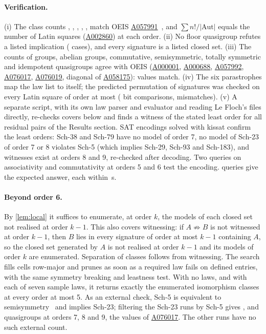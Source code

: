 \documentclass[11pt,a4paper]{article}
\newcommand{\Sch}[1]{\textsf{Sch-#1}}
\newcommand{\oeis}[1]{\href{https://oeis.org/#1}{#1}}
\theoremstyle{definition}
\begin{document}
\paragraph{Verification.}
(i) The class counts \IsoOne, \IsoTwo, \IsoThree, \IsoFour, \IsoFive, \IsoSix{} match
OEIS \oeis{A057991}~\cite{oeis}, and $\sum n!/|\mathrm{Aut}|$ equals the number of
Latin squares (\oeis{A002860}) at each order. (ii) No floor quasigroup refutes a
listed implication (\FalseRefSix{} cases), and every signature is a listed closed
set. (iii) The counts of groups, abelian groups, commutative, semisymmetric, totally
symmetric and idempotent quasigroups agree with OEIS (\oeis{A000001},
\oeis{A000688}, \oeis{A057992}, \oeis{A076017}, \oeis{A076019}, diagonal of
\oeis{A058175}):
\GThreeAllMatch{} \GThreeCells{} values match. (iv) The six parastrophes map the law
list to itself; the predicted permutation of signatures was checked on every Latin
square of order at most \GFourMaxOrder{} (\GFourChecks{} bit comparisons,
\GFourMismatches{} mismatches). (v) A separate script, with its own law parser and
evaluator and reading Le Floch's files directly, re-checks \IndepCoversOk{} covers
below and finds a witness of the stated least order for all \IndepModelPairs{} residual
pairs of the Results section. SAT encodings solved with kissat confirm the least
orders: \Sch{38} and \Sch{79} have no model of order 7, no model of \Sch{23} of order 7
or 8 violates \Sch{5} (which implies \Sch{29}, \Sch{93} and \Sch{183}), and witnesses
exist at orders 8 and 9, re-checked after decoding. Two queries on associativity and
commutativity at orders 5 and 6 test the encoding. \SatAllOk{} \SatQueries{} queries
give the expected answer, each within \SatMaxSeconds{}\,s.

\paragraph{Beyond order 6.}
By \cref{lem:local} it suffices to enumerate, at order $k$, the models of each
closed set not realised at order $k-1$. This also covers witnessing: if
$A \not\Rightarrow B$ is not witnessed at order $k-1$, then $B$ lies in every signature
of order at most $k-1$ containing $A$, so the closed set generated by $A$ is not
realised at order $k-1$ and its models of order $k$ are enumerated. Separation of
classes follows from witnessing. The search fills cells row-major and prunes as soon
as a required law fails on defined entries, with the same symmetry breaking and
leastness test. With no laws, and with each of seven sample laws, it returns exactly
the enumerated isomorphism classes at every order at most 5. As an external check,
\Sch{5} is equivalent to semisymmetry~\cite{lefloch} and implies \Sch{23}; filtering
the \Sch{23} runs by \Sch{5} gives \SemiSeven, \SemiEight{} and \SemiNine{}
quasigroups at orders 7, 8 and 9, the values of \oeis{A076017}. The other runs have
no such external count.
\end{document}
